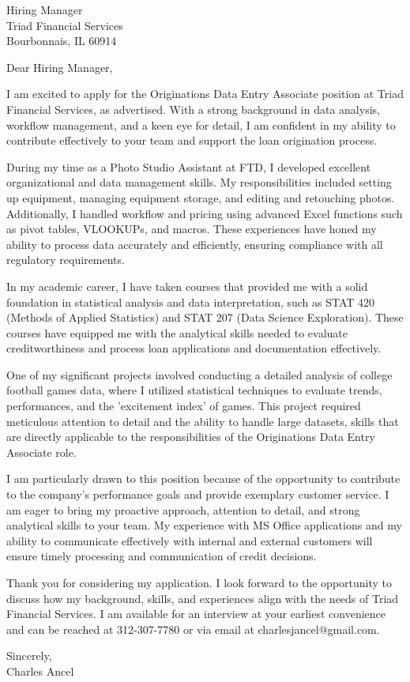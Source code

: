 \documentclass{letter}
\begin{document}
\begin{letter}{Hiring Manager\\Triad Financial Services\\Bourbonnais, IL 60914}

\opening{Dear Hiring Manager,}

I am excited to apply for the Originations Data Entry Associate position at Triad Financial Services, as advertised. With a strong background in data analysis, workflow management, and a keen eye for detail, I am confident in my ability to contribute effectively to your team and support the loan origination process.

During my time as a Photo Studio Assistant at FTD, I developed excellent organizational and data management skills. My responsibilities included setting up equipment, managing equipment storage, and editing and retouching photos. Additionally, I handled workflow and pricing using advanced Excel functions such as pivot tables, VLOOKUPs, and macros. These experiences have honed my ability to process data accurately and efficiently, ensuring compliance with all regulatory requirements.

In my academic career, I have taken courses that provided me with a solid foundation in statistical analysis and data interpretation, such as STAT 420 (Methods of Applied Statistics) and STAT 207 (Data Science Exploration). These courses have equipped me with the analytical skills needed to evaluate creditworthiness and process loan applications and documentation effectively.

One of my significant projects involved conducting a detailed analysis of college football games data, where I utilized statistical techniques to evaluate trends, performances, and the 'excitement index' of games. This project required meticulous attention to detail and the ability to handle large datasets, skills that are directly applicable to the responsibilities of the Originations Data Entry Associate role.

I am particularly drawn to this position because of the opportunity to contribute to the company's performance goals and provide exemplary customer service. I am eager to bring my proactive approach, attention to detail, and strong analytical skills to your team. My experience with MS Office applications and my ability to communicate effectively with internal and external customers will ensure timely processing and communication of credit decisions.

Thank you for considering my application. I look forward to the opportunity to discuss how my background, skills, and experiences align with the needs of Triad Financial Services. I am available for an interview at your earliest convenience and can be reached at 312-307-7780 or via email at charlesjancel@gmail.com.

\begin{flushleft}
Sincerely,\\

Charles Ancel
\end{flushleft}

\end{letter}
\end{document}
